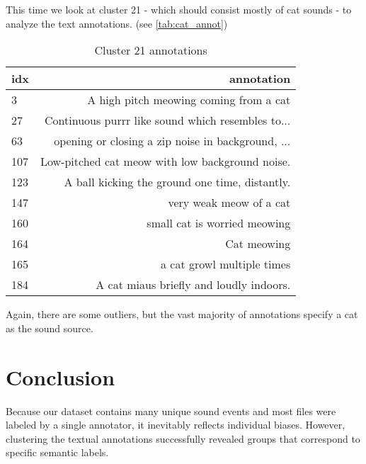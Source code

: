 \documentclass{article}
\begin{document}
This time we look at cluster 21 - which should consist mostly of cat sounds - to analyze the text annotations. (see \autoref{tab:cat_annot})

\begin{table}[H]
  \caption{Cluster 21 annotations}
  \label{tab:cat_annot}
  \centering
  \begin{tabular}{lr}
    \toprule
    idx & annotation \\
    \midrule
    3 & A high pitch meowing coming from a cat \\
    27 & Continuous purrr like sound which resembles to... \\
    63 & opening or closing a zip noise in background, ... \\
    107 & Low-pitched cat meow with low background noise. \\
    123 & A ball kicking the ground one time, distantly. \\
    147 & very weak meow of a cat \\
    160 & small cat is worried meowing \\
    164 & Cat meowing \\
    165 & a cat growl multiple times \\
    184 & A cat miaus briefly and loudly indoors. \\
    \bottomrule
  \end{tabular}
\end{table}

Again, there are some outliers, but the vast majority of annotations specify a cat as the sound source.

\section{Conclusion}
Because our dataset contains many unique sound events and most files were labeled by a single annotator, it inevitably reflects individual biases. However, clustering the textual annotations successfully revealed groups that correspond to specific semantic labels.
\end{document}
